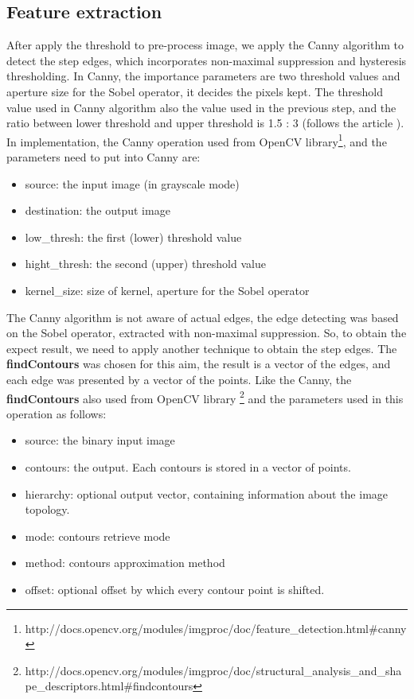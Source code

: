 \subsection{Feature extraction}
After apply the threshold to pre-process image, we apply the Canny algorithm to detect the step edges, which incorporates non-maximal suppression and hysteresis thresholding. In Canny, the importance parameters are two threshold values and aperture size for the Sobel operator, it decides the pixels kept. The threshold value used in Canny algorithm also the value used in the previous step, and the ratio between lower threshold and upper threshold is 1.5 : 3 (follows the article \cite{palaniswamy2010automatic}). In implementation, the Canny operation used from OpenCV library\footnote{http://docs.opencv.org/modules/imgproc/doc/feature\_detection.html\#canny}, and the parameters need to put into Canny are:
\begin{itemize}
\item source: the input image (in grayscale mode)
\item destination: the output image
\item low\_thresh: the first (lower) threshold value
\item hight\_thresh: the second (upper) threshold value
\item kernel\_size: size of kernel, aperture for the Sobel operator
\end{itemize}
The Canny algorithm is not aware of actual edges, the edge detecting was based on the Sobel operator, extracted with non-maximal suppression. So, to obtain the expect result, we  need to apply another technique to obtain the step edges. The \textbf{findContours} was chosen for this aim, the result is a vector of the edges, and each edge was presented by a vector of the points. Like the Canny, the \textbf{findContours} also used from OpenCV library \footnote{http://docs.opencv.org/modules/imgproc/doc/structural\_analysis\_and\_shape\_descriptors.html\#findcontours} and the parameters used in this operation as follows:
\begin{itemize}
\item source: the binary input image
\item contours: the output. Each contours is stored in a vector of points.
\item hierarchy: optional output vector, containing information about the image topology.
\item mode: contours retrieve mode
\item method: contours approximation method
\item offset: optional offset by which every contour point is shifted.
\end{itemize}
